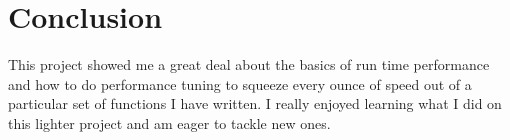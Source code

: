\documentclass[11pt]{article}
\begin{document}
\section{Conclusion}
This project showed me a great deal about the basics of run time performance and how to do performance tuning to squeeze every ounce of speed out of a particular set of functions I have written.
 I really enjoyed learning what I did on this lighter project and am eager to tackle new ones.
\end{document}
